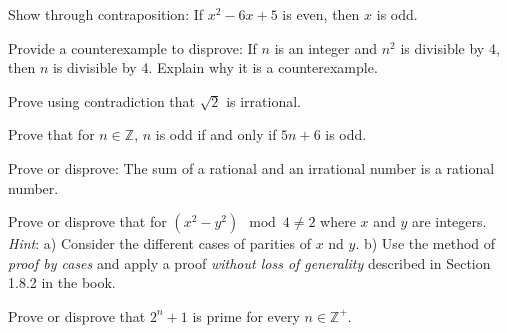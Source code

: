 \documentclass[a4paper]{exam}
\theoremstyle{definition}
\newcommand\Z{\ensuremath{\mathbb{Z}}}
\begin{document}
\begin{questions}
  
\question
  Show through contraposition: If $x^2 - 6x + 5$ is even, then $x$ is odd.
  \begin{solution}
  \end{solution}

\question Provide a counterexample to disprove: If $n$ is an integer and $n^2$ is divisible by 4, then $n$ is divisible by 4. Explain why it is a counterexample.

  \begin{solution}
  \end{solution}
  
\question Prove using contradiction that $\sqrt{2}$ is irrational.

  \begin{solution}
  \end{solution}
  

\question Prove that for $n\in\Z$, $n$ is odd if and only if $5n + 6$ is odd.

  \begin{solution}
  \end{solution}

\question Prove or disprove: The sum of a rational and an irrational number is a rational number.

  \begin{solution}
    \end{solution}
  
\question Prove or disprove that for $(x^2 - y^2) \mod 4 \neq 2$ where $x$ and $y$ are integers.\\
  \textit{Hint}: a) Consider the different cases of parities of $x$ nd $y$. b) Use the method of \textit{proof by cases} and apply a proof \textit{without loss of generality} described in Section 1.8.2 in the book.

  \begin{solution}
  \end{solution}

\question 
  Prove or disprove that $2^n + 1$ is prime for every $n\in\Z^+$.

  \begin{solution}
  \end{solution}
\end{questions}
\end{document}
